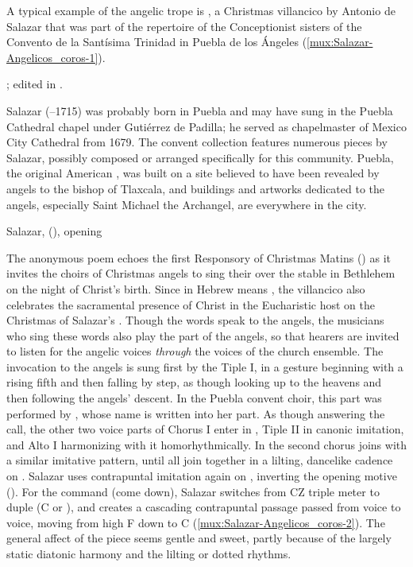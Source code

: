 A typical example of the angelic trope is , a Christmas villancico by Antonio de Salazar that was part of the
repertoire of the Conceptionist sisters of the Convento de la Santísima
Trinidad in Puebla de los Ángeles (\cref{mux:Salazar-Angelicos_coros-1}).%
\begin{Footnote} 
    ; edited in \autocite{Cashner:WLSCM32}.  
\end{Footnote}
Salazar (--1715) was probably born in Puebla and may have sung in
the Puebla Cathedral chapel under Gutiérrez de Padilla; he served as
chapelmaster of Mexico City Cathedral from 1679.%
    \Autocite{Koegel:Salazar} %
The convent collection features numerous pieces by Salazar, possibly composed
or arranged specifically for this community.%
    \citXXX[catalog]
Puebla, the original American , was built on a site
believed to have been revealed by angels to the bishop of Tlaxcala, and
buildings and artworks dedicated to the angels, especially Saint Michael the
Archangel, are everywhere in the city.

{Salazar,  (),
opening}

The anonymous poem echoes the first Responsory of Christmas Matins
() as it invites the choirs of Christmas
angels to sing their  over the stable in Bethlehem on the night
of Christ's birth.
Since  in Hebrew means , the
villancico also celebrates the sacramental presence of Christ in the
Eucharistic host on the Christmas of Salazar's .
Though the words speak to the angels, the musicians who sing these words also
play the part of the angels, so that hearers are invited to listen for the
angelic voices \emph{through} the voices of the church ensemble. 
The invocation to the angels is sung first by the Tiple I, in a gesture
beginning with a rising fifth and then falling by step, as though looking up to
the heavens and then following the angels' descent.
In the Puebla convent choir, this part was performed by ,
whose name is written into her part.
As though answering the call, the other two voice parts of Chorus I enter in
, Tiple II in canonic imitation, and Alto I harmonizing with it
homorhythmically. 
In  the second chorus joins with a similar imitative
pattern, until all join together in a lilting, dancelike cadence on
.
Salazar uses contrapuntal imitation again on ,
inverting the opening motive ().
For the command  (come down), Salazar switches from CZ
triple meter to duple (C or ), and creates a cascading
contrapuntal passage passed from voice to voice, moving from high F
down to C (\cref{mux:Salazar-Angelicos_coros-2}).
The general affect of the piece seems gentle and sweet, partly because of the
largely static diatonic harmony and the lilting or dotted rhythms.

